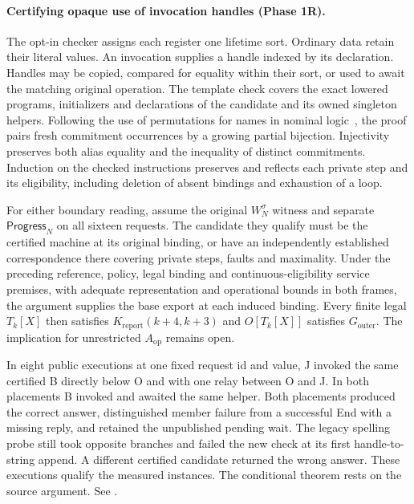 \documentclass[11pt,a4paper]{article}
\theoremstyle{definition}
\theoremstyle{remark}
\begin{document}
\paragraph{Certifying opaque use of invocation handles (Phase 1R).} The opt-in checker assigns each register one lifetime sort. Ordinary data retain their literal values. An invocation supplies a handle indexed by its declaration. Handles may be copied, compared for equality within their sort, or used to await the matching original operation. The template check covers the exact lowered programs, initializers and declarations of the candidate and its owned singleton helpers. Following the use of permutations for names in nominal logic~\cite{pitts2003nominal}, the proof pairs fresh commitment occurrences by a growing partial bijection. Injectivity preserves both alias equality and the inequality of distinct commitments. Induction on the checked instructions preserves and reflects each private step and its eligibility, including deletion of absent bindings and exhaustion of a loop.

For either boundary reading, assume the original $W_N^\sigma$ witness and separate $\mathsf{Progress}_N$ on all sixteen requests. The candidate they qualify must be the certified machine at its original binding, or have an independently established correspondence there covering private steps, faults and maximality. Under the preceding reference, policy, legal binding and continuous-eligibility service premises, with adequate representation and operational bounds in both frames, the argument supplies the base export at each induced binding. Every finite legal $T_k[X]$ then satisfies $K_{\mathrm{report}}(k+4,k+3)$ and $O[T_k[X]]$ satisfies $G_{\mathrm{outer}}$. The implication for unrestricted $A_{\mathrm{op}}$ remains open.

In eight public executions at one fixed request id and value, J invoked the same certified B directly below O and with one relay between O and J. In both placements B invoked and awaited the same helper. Both placements produced the correct answer, distinguished member failure from a successful End with a missing reply, and retained the unpublished pending wait. The legacy spelling probe still took opposite branches and failed the new check at its first handle-to-string append. A different certified candidate returned the wrong answer. These executions qualify the measured instances. The conditional theorem rests on the source argument. See .
\end{document}
